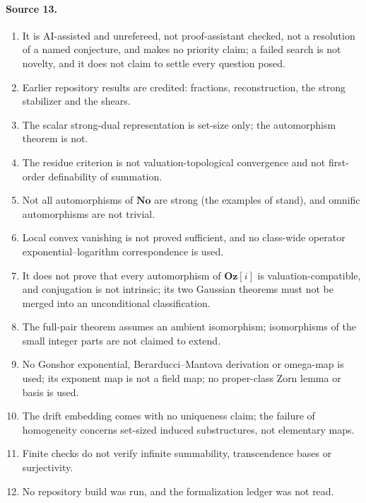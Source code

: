 \documentclass[11pt,oneside]{article}
\numberwithin{equation}{section}
\theoremstyle{definition}
\theoremstyle{remark}
\newcommand{\No}{\mathbf{No}}
\newcommand{\Og}{\mathbf{Oz}[i]}
\begin{document}
\paragraph{Source 13.}
\begin{enumerate}[itemsep=1pt]
\item It is AI-assisted and unrefereed, not proof-assistant checked, not a resolution of a named
conjecture, and makes no priority claim; a failed search is not novelty, and it does not claim to
settle every question posed.
\item Earlier repository results are credited: fractions, reconstruction, the strong stabilizer
and the shears.
\item The scalar strong-dual representation is set-size only; the automorphism theorem is not.
\item The residue criterion is not valuation-topological convergence and not first-order
definability of summation.
\item Not all automorphisms of $\No$ are strong (the examples of \cite{KKS} stand), and omnific
automorphisms are not trivial.
\item Local convex vanishing is not proved sufficient, and no class-wide operator
exponential--logarithm correspondence is used.
\item It does not prove that every automorphism of $\Og$ is valuation-compatible, and conjugation
is not intrinsic; its two Gaussian theorems must not be merged into an unconditional
classification.
\item The full-pair theorem assumes an ambient isomorphism; isomorphisms of the small integer parts
are not claimed to extend.
\item No Gonshor exponential, Berarducci--Mantova derivation or omega-map is used; its exponent
map is not a field map; no proper-class Zorn lemma or basis is used.
\item The drift embedding comes with no uniqueness claim; the failure of homogeneity concerns
set-sized induced substructures, not elementary maps.
\item Finite checks do not verify infinite summability, transcendence bases or surjectivity.
\item No repository build was run, and the formalization ledger was not read.
\end{enumerate}
\end{document}
